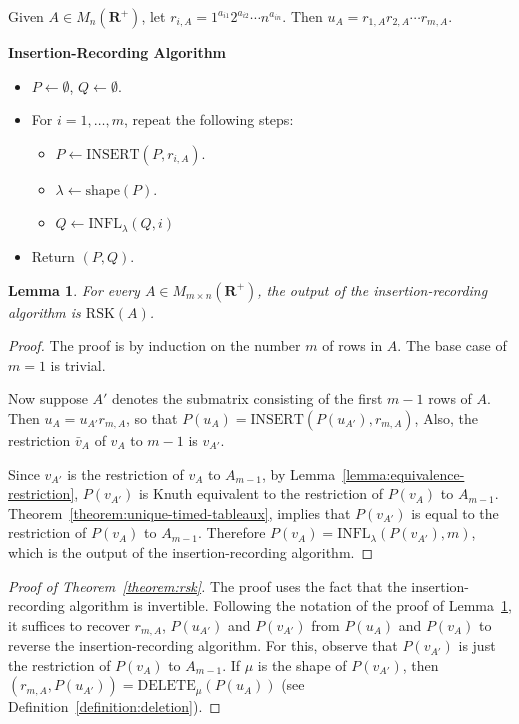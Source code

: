 \documentclass[10pt]{amsproc}
\newtheorem{lemma}[theorem]{Lemma}
\theoremstyle{definition}
\theoremstyle{remark}
\newcommand{\ins}{\mathrm{INSERT}}
\newcommand{\del}{\mathrm{DELETE}}
\newcommand{\shape}{\mathrm{shape}}
\newcommand{\rp}{\mathbf{R}^+}
\newcommand{\rsk}{\mathrm{RSK}}
\newcommand{\ot}{\leftarrow}
\newcommand{\infl}{\mathrm{INFL}}
\begin{document}
Given $A\in M_n(\rp)$, let $r_{i,A} = 1^{a_{i1}}2^{a_{i2}}\dotsb n^{a_{in}}$.
Then $u_A=r_{1,A}r_{2,A}\dotsb r_{m,A}$.
\begin{center}
  \textbf{Insertion-Recording Algorithm}
\end{center}
\begin{itemize}
\item $P\ot \emptyset$, $Q\ot \emptyset$.
\item For $i=1,\dotsc, m$, repeat the following steps:
  \begin{itemize}
  \item $P\ot \ins(P, r_{i,A})$.
  \item $\lambda \ot \shape(P)$.
  \item $Q\ot \infl_\lambda(Q,i)$
  \end{itemize}
\item Return $(P, Q)$.
\end{itemize}
\begin{lemma}
  \label{lemma:insertion-rec-algo}
  For every $A\in M_{m\times n}(\rp)$, the output of the insertion-recording algorithm is $\rsk(A)$.
\end{lemma}
\begin{proof}
  The proof is by induction on the number $m$ of rows in $A$.
  The base case of $m=1$ is trivial.

  Now suppose $A'$ denotes the submatrix consisting of the first $m-1$ rows of $A$.
  Then $u_A = u_{A'}r_{m,A}$, so that $P(u_A)=\ins(P(u_{A'}),r_{m,A})$,
  Also, the restriction $\bar v_A$ of $v_A$ to $m-1$ is $v_{A'}$.
  
  Since $v_{A'}$ is the restriction of $v_A$ to $A_{m-1}$, by Lemma~\ref{lemma:equivalence-restriction}, $P(v_{A'})$ is Knuth equivalent to the restriction of $P(v_A)$ to $A_{m-1}$.
  Theorem~\ref{theorem:unique-timed-tableaux}, implies that $P(v_{A'})$ is equal to the restriction of $P(v_A)$ to $A_{m-1}$.
  Therefore $P(v_A)=\infl_\lambda(P(v_{A'}), m)$, which is the output of the insertion-recording algorithm.
\end{proof}
\begin{proof}
  [Proof of Theorem~\ref{theorem:rsk}]
  The proof uses the fact that the insertion-recording algorithm is invertible.
  Following the notation of the proof of Lemma~\ref{lemma:insertion-rec-algo}, it suffices to recover $r_{m,A}$, $P(u_{A'})$ and $P(v_{A'})$ from $P(u_A)$ and $P(v_A)$ to reverse the insertion-recording algorithm.
  For this, observe that $P(v_{A'})$ is just the restriction of $P(v_A)$ to $A_{m-1}$.
  If $\mu$ is the shape of $P(v_{A'})$, then $(r_{m,A},P(u_{A'}))=\del_\mu(P(u_A))$ (see Definition~\ref{definition:deletion}).
\end{proof}
\end{document}
